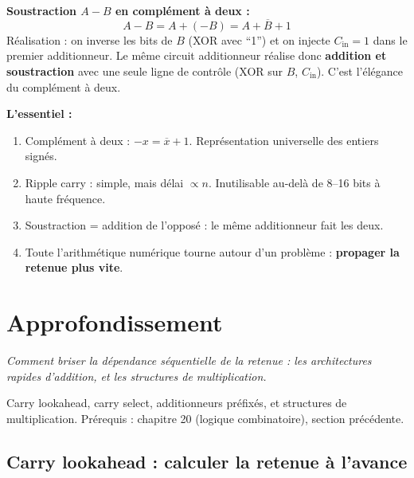 \documentclass[12pt,a4paper,twoside]{book}
\begin{document}
\begin{formule}
\textbf{Soustraction $A - B$ en complément à deux :}
\[
A - B = A + (-B) = A + \overline{B} + 1
\]
Réalisation : on inverse les bits de $B$ (XOR avec ``1'') et on injecte $C_{\text{in}} = 1$ dans le premier additionneur. Le même circuit additionneur réalise donc \textbf{addition et soustraction} avec une seule ligne de contrôle (XOR sur $B$, $C_{\text{in}}$). C'est l'élégance du complément à deux.
\end{formule}

\begin{retenir}
\textbf{L'essentiel :}
\begin{enumerate}[nosep]
\item Complément à deux : $-x = \overline{x} + 1$. Représentation universelle des entiers signés.
\item Ripple carry : simple, mais délai $\propto n$. Inutilisable au-delà de 8--16 bits à haute fréquence.
\item Soustraction = addition de l'opposé : le même additionneur fait les deux.
\item Toute l'arithmétique numérique tourne autour d'un problème : \textbf{propager la retenue plus vite}.
\end{enumerate}
\end{retenir}

\section{Approfondissement}

\vspace{0.3cm}
\textit{Comment briser la dépendance séquentielle de la retenue : les architectures rapides d'addition, et les structures de multiplication.}
\vspace{0.3cm}

\begin{approfondissement}
Carry lookahead, carry select, additionneurs préfixés, et structures de multiplication. Prérequis : chapitre 20 (logique combinatoire), section précédente.
\end{approfondissement}

\subsection{Carry lookahead : calculer la retenue à l'avance}
\end{document}
